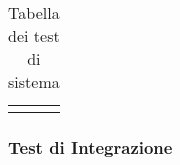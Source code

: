 \documentclass[../piano-di-qualifica.tex]{subfiles}
\begin{document}
\begin{longtable}[H]{>{\centering\bfseries}m{3cm} >{}m{10cm} >{\centering\arraybackslash}m{3cm}}



  \rowcolor{white}
  \caption{Tabella dei test di sistema}%
  \label{tab:test_sistema}
\end{longtable}

\subsubsection{Test di Integrazione}%
\label{subs:test_di_integrazione}
\end{document}
